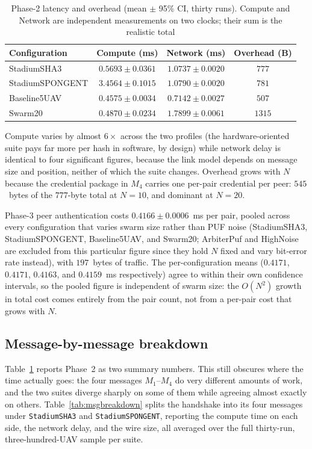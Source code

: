 \documentclass[11pt,a4paper]{article}
\begin{document}
\begin{table}[H]
\centering
\caption{Phase-2 latency and overhead (mean $\pm$ 95\% CI, thirty runs).
Compute and Network are independent measurements on two clocks; their sum is the
realistic total}
\label{tab:latency}
\small
\begin{tabular}{@{}lccc@{}}
\toprule
\textbf{Configuration} & \textbf{Compute (ms)} &
\textbf{Network (ms)} & \textbf{Overhead (B)} \\
\midrule
StadiumSHA3     & $0.5693 \pm 0.0361$ & $1.0737 \pm 0.0020$ & $777$ \\
StadiumSPONGENT & $3.4564 \pm 0.1015$ & $1.0790 \pm 0.0020$ & $781$ \\
Baseline5UAV    & $0.4575 \pm 0.0034$ & $0.7142 \pm 0.0027$ & $507$ \\
Swarm20         & $0.4870 \pm 0.0234$ & $1.7899 \pm 0.0061$ & $1315$ \\
\bottomrule
\end{tabular}
\end{table}

Compute varies by almost $6\times$ across the two profiles (the
hardware-oriented suite pays far more per hash in software, by design) while
network delay is identical to four significant figures, because the link model
depends on message size and position, neither of which the suite changes.
Overhead grows with $N$ because the credential package in $M_4$ carries one
per-pair credential per peer: $545$~bytes of the $777$-byte total at $N{=}10$,
and dominant at $N{=}20$.

Phase-3 peer authentication costs $0.4166 \pm 0.0006$~ms per pair, pooled across
every configuration that varies swarm size rather than PUF noise (StadiumSHA3,
StadiumSPONGENT, Baseline5UAV, and Swarm20; ArbiterPuf and HighNoise are excluded
from this particular figure since they hold $N$ fixed and vary bit-error rate
instead), with $197$~bytes of traffic. The per-configuration means
($0.4171$, $0.4171$, $0.4163$, and $0.4159$~ms respectively) agree to within their
own confidence intervals, so the pooled figure is independent of swarm size: the
$O(N^2)$ growth in total cost comes entirely from the pair count, not from a
per-pair cost that grows with $N$.

\subsection{Message-by-message breakdown}
\label{subsec:message_breakdown}

Table~\ref{tab:latency} reports Phase~2 as two summary numbers. This still
obscures where the time actually goes: the four messages $M_1$--$M_4$ do very
different amounts of work, and the two suites diverge sharply on some of them
while agreeing almost exactly on others. Table~\ref{tab:msgbreakdown} splits the
handshake into its four messages under \texttt{StadiumSHA3} and
\texttt{StadiumSPONGENT}, reporting the compute time on each side, the network
delay, and the wire size, all averaged over the full thirty-run, three-hundred-UAV
sample per suite.
\end{document}

